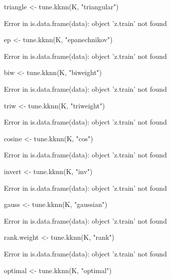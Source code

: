 \documentclass[letterpaper]{article}\usepackage[]{graphicx}\usepackage[]{color}
\begin{document}
\begin{Schunk}
\begin{Sinput}
triangle <- tune.kknn(K, "triangular")
\end{Sinput}
\begin{Soutput}
Error in is.data.frame(data): object 'z.train' not found
\end{Soutput}
\begin{Sinput}
ep <- tune.kknn(K, "epanechnikov")
\end{Sinput}
\begin{Soutput}
Error in is.data.frame(data): object 'z.train' not found
\end{Soutput}
\begin{Sinput}
biw <- tune.kknn(K, "biweight")
\end{Sinput}
\begin{Soutput}
Error in is.data.frame(data): object 'z.train' not found
\end{Soutput}
\begin{Sinput}
triw <- tune.kknn(K, "triweight")
\end{Sinput}
\begin{Soutput}
Error in is.data.frame(data): object 'z.train' not found
\end{Soutput}
\begin{Sinput}
cosine <- tune.kknn(K, "cos")
\end{Sinput}
\begin{Soutput}
Error in is.data.frame(data): object 'z.train' not found
\end{Soutput}
\begin{Sinput}
invert <- tune.kknn(K, "inv")
\end{Sinput}
\begin{Soutput}
Error in is.data.frame(data): object 'z.train' not found
\end{Soutput}
\begin{Sinput}
gauss <- tune.kknn(K, "gaussian")
\end{Sinput}
\begin{Soutput}
Error in is.data.frame(data): object 'z.train' not found
\end{Soutput}
\begin{Sinput}
rank.weight <- tune.kknn(K, "rank")
\end{Sinput}
\begin{Soutput}
Error in is.data.frame(data): object 'z.train' not found
\end{Soutput}
\begin{Sinput}
optimal <- tune.kknn(K, "optimal")
\end{Sinput}

\end{Schunk}
\end{document}
